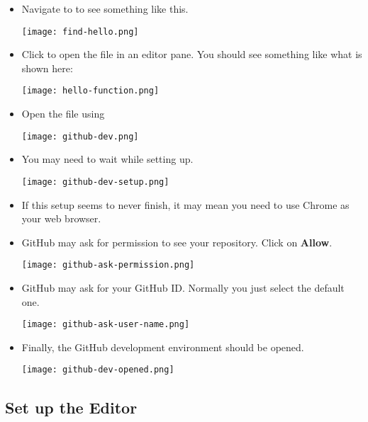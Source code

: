 \begin{itemize}
\item Navigate to  to see something like this.

\noindent\texttt{[image: find-hello.png]}



\item Click  to open the file in an editor pane.  You
  should see something like what is shown here:

\noindent\texttt{[image: hello-function.png]}


\item Open the file using 

\noindent\texttt{[image: github-dev.png]}


\item You may need to wait while setting up.

\noindent\texttt{[image: github-dev-setup.png]}

\item If this setup seems to never finish, it may mean you need to use Chrome as your web browser.


\item GitHub may ask for permission to see your repository.  Click on \textbf{Allow}.
  
\noindent\texttt{[image: github-ask-permission.png]}
  

\item GitHub may ask for your GitHub ID.  Normally you just select the default one.
  
\noindent\texttt{[image: github-ask-user-name.png]}

\item Finally, the GitHub development environment should be opened.
  
\noindent\texttt{[image: github-dev-opened.png]}



\end{itemize}

\subsection{Set up the Editor}
  
